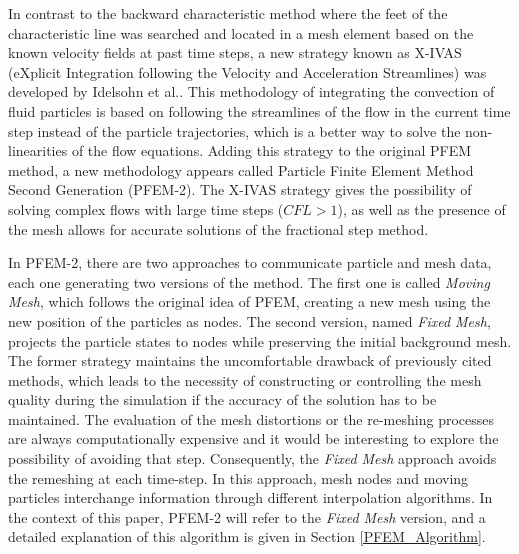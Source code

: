 In contrast to the backward characteristic method where the feet of the characteristic line was searched and located in a mesh element based on the known velocity fields at past time steps, a new strategy known as X-IVAS (eXplicit Integration following the Velocity and Acceleration Streamlines) was developed by Idelsohn et al.\cite{Idelsohn12}. This methodology of integrating the convection of fluid particles is based on following the streamlines of the flow in the current time step instead of the particle trajectories, which is a better way to solve the non-linearities of the flow equations. Adding this strategy to the original PFEM method, a new methodology appears called Particle Finite Element Method Second Generation (PFEM-2)\cite{Idelsohn12b}. The X-IVAS strategy gives the possibility of solving complex flows with large time steps ($CFL>1$), as well as the presence of the mesh allows for accurate solutions of the fractional step method.

In PFEM-2, there are two approaches to communicate particle and mesh data, each one generating two versions of the method. The first one is called \textit{Moving Mesh}, which follows the original idea of PFEM, creating a new mesh using the new position of the particles as nodes. The second version, named \textit{Fixed Mesh}, projects the particle states to nodes while preserving the initial background mesh. The former strategy maintains the uncomfortable drawback of previously cited methods, which leads to the necessity of constructing or controlling the mesh quality during the simulation if the accuracy of the solution has to be maintained. The evaluation of the mesh distortions or the re-meshing processes are always computationally expensive and it would be interesting to explore the possibility of avoiding that step. Consequently, the \textit{Fixed Mesh} approach avoids the remeshing at each time-step. In this approach, mesh nodes and moving particles interchange information through different interpolation algorithms. In the context of this paper, PFEM-2 will refer to the \textit{Fixed Mesh} version, and a detailed explanation of this algorithm is given in Section \ref{PFEM_Algorithm}.

